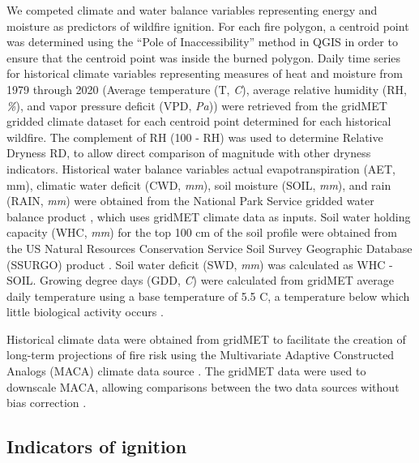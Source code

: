 \documentclass[11p]{article}
\begin{document}
We competed climate and water balance variables representing energy and moisture as predictors of wildfire ignition. For each fire polygon, a centroid point was determined using the ``Pole of Inaccessibility'' method in QGIS in order to ensure that the centroid point was inside the burned polygon. Daily time series for historical climate variables representing measures of heat and moisture from 1979 through 2020 (Average temperature (T, \textit{\degree C}), average relative humidity (RH, \textit{\%}), and vapor pressure deficit (VPD, \textit{Pa})) were retrieved from the gridMET gridded climate dataset \citep{abatzoglouDevelopmentGriddedSurface2013} for each centroid point determined for each historical wildfire. The complement of RH (100 - RH) was used to determine Relative Dryness RD, to allow direct comparison of magnitude with other dryness indicators. Historical water balance variables actual evapotranspiration (AET, mm), climatic water deficit (CWD, \textit{mm}), soil moisture (SOIL, \textit{mm}), and rain (RAIN, \textit{mm}) were obtained from the National Park Service gridded water balance product \citep{tercekHistoricalChangesPlant2021}, which uses gridMET climate data as inputs. Soil water holding capacity (WHC, \textit{mm}) for the top 100 cm of the soil profile were obtained from the US Natural Resources Conservation Service 
Soil Survey Geographic Database (SSURGO) product \citep{naturalresourcesconservationserviceSoilSurveyGeographic2015}. Soil water deficit (SWD, \textit{mm}) was calculated as WHC - SOIL. Growing degree days (GDD, \textit{\degree C}) were calculated from gridMET average daily temperature using a base temperature of 5.5 \degree C, a temperature below which little biological activity occurs \citep{mcmasterGrowingDegreedaysOne1997}. 

Historical climate data were obtained from gridMET to facilitate the creation of long-term projections of fire risk using the Multivariate Adaptive Constructed Analogs (MACA) climate data source \citep{abatzoglouComparisonStatisticalDownscaling2012}. The gridMET data were used to downscale MACA, allowing comparisons between the two data sources without bias correction \citep{tercekRobustProjectionsConsequences2023}.

\subsection{Indicators of ignition}
\end{document}
